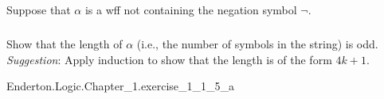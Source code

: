 \documentclass{report}
\begin{document}
\subsection{}%

  Suppose that $\alpha$ is a wff not containing the negation symbol $\neg$.

\subsubsection{}%

  Show that the length of $\alpha$ (i.e., the number of symbols in the string)
    is odd.
  \textit{Suggestion}: Apply induction to show that the length is of the form
    $4k + 1$.

    {Enderton.Logic.Chapter\_1.exercise\_1\_1\_5\_a}
\end{document}
